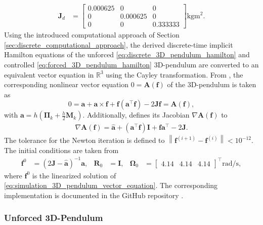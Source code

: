 \begin{align}
    \bm{J}_d
    &=
    \begin{bmatrix}
        0.000625 & 0 & 0 \\
        0 & 0.000625 & 0 \\
        0 & 0 & 0.333333
    \end{bmatrix}
    \si{\kilogram\meter\squared}.
\end{align}
Using the introduced computational approach of Section \ref{sec:discrete_computational_approach}, the derived discrete-time implicit Hamilton equations
of the unforced \eqref{eq:discrete_3D_pendulum_hamilton} and controlled \eqref{eq:forced_3D_pendulum_hamilton} 3D-pendulum are converted to an equivalent vector equation in $\mathbb{R}^3$ using the Cayley transformation. From \cite{ColomboJimenez2012SO3_Cayley}, the corresponding nonlinear vector equation $0 = \bm{A}(\bm{f})$ of the 3D-pendulum is taken as
\begin{equation}\label{eq:simulation_3D_pendulum_vector_equation}
    0 = \bm{a}+\bm{a} \times \bm{f} + \bm{f}(\bm{a}^\top \bm{f})-2 \bm{J} \bm{f} = \bm{A}(\bm{f}),
\end{equation}
with $\bm{a}= h (\bm{\Pi}_k + \frac{h}{2} \bm{M}_k)$. Additionally, \cite{ColomboJimenez2012SO3_Cayley} defines its Jacobian $\nabla \bm{A}\!\left(\bm{f}\right)$ to
\begin{align}\label{eq:Caley_Jacobian}
\nabla \bm{A}(\bm{f})
=
\hat{\bm{a}}
+
(\bm{a}^{\top}\bm{f})\bm{I}
+
\bm{f}\bm{a}^{\top}
-
2\bm{J}.
\end{align}
The tolerance for the Newton iteration is defined to $\left\lVert \bm{f}^{(i+1)} - \bm{f}^{(i)} \right\rVert < 10^{-12}$. The initial conditions are taken from \cite{Lee2008} 
\begin{align}
\bm{f}^0 &= (2 \bm{J} - \hat{\bm{a}})^{-1}\bm{a},&
    \bm{R}_0 &= \bm{I}, &
    \bm{\Omega}_0 &=
    \begin{bmatrix}
        4.14 & 4.14 & 4.14
    \end{bmatrix}^{\top}\si{\radian\per\second},
\end{align} where $\bm{f}^0$ is the linearized solution of
\eqref{eq:simulation_3D_pendulum_vector_equation}. The corresponding implementation is documented in the GitHub repository \cite{Elshani2026CTO_GitHub}.

\subsubsection{Unforced 3D-Pendulum}

